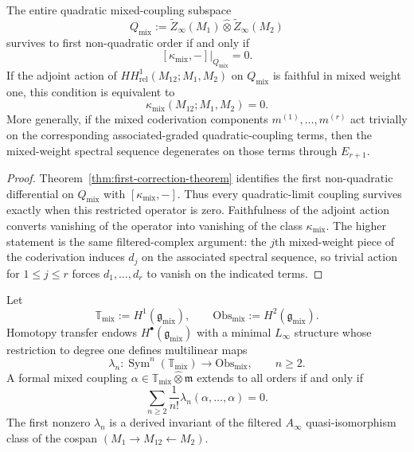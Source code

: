 \begin{corollary}
\label{cor:persistence-criterion-quadratic-law}
The entire quadratic mixed-coupling subspace
\[
Q_{\mathrm{mix}}
:=
\widetilde Z_\infty(M_1)\widehat\otimes \widetilde Z_\infty(M_2)
\]
survives to first non-quadratic order if and only if
\[
[\kappa_{\mathrm{mix}},-]\big|_{Q_{\mathrm{mix}}}=0.
\]
If the adjoint action of
$HH^1_{\mathrm{rel}}(M_{12};M_1,M_2)$ on $Q_{\mathrm{mix}}$ is faithful in mixed weight one, this condition is equivalent to
\[
\kappa_{\mathrm{mix}}(M_{12};M_1,M_2)=0.
\]
More generally, if the mixed coderivation components $m^{(1)},\dots,m^{(r)}$ act trivially on the corresponding associated-graded quadratic-coupling terms, then the mixed-weight spectral sequence degenerates on those terms through $E_{r+1}$.
\end{corollary}

\begin{proof}
Theorem~\ref{thm:first-correction-theorem} identifies the first
non-quadratic differential on $Q_{\mathrm{mix}}$ with
$[\kappa_{\mathrm{mix}},-]$. Thus every quadratic-limit coupling
survives exactly when this restricted operator is zero. Faithfulness
of the adjoint action converts vanishing of the operator into
vanishing of the class $\kappa_{\mathrm{mix}}$. The higher statement
is the same filtered-complex argument: the $j$th mixed-weight piece
of the coderivation induces $d_j$ on the associated spectral sequence,
so trivial action for $1\le j\le r$ forces $d_1,\dots,d_r$ to vanish
on the indicated terms.
\end{proof}

\begin{theorem}
\label{thm:universal-interaction-brackets}
Let
\[
\mathbb T_{\mathrm{mix}}:=H^1(\mathfrak g_{\mathrm{mix}}),
\qquad
\mathrm{Obs}_{\mathrm{mix}}:=H^2(\mathfrak g_{\mathrm{mix}}).
\]
Homotopy transfer endows $H^\bullet(\mathfrak g_{\mathrm{mix}})$ with a minimal $L_\infty$ structure whose restriction to degree one defines multilinear maps
\[
\lambda_n : \operatorname{Sym}^n(\mathbb T_{\mathrm{mix}}) \longrightarrow \mathrm{Obs}_{\mathrm{mix}},
\qquad n\ge 2.
\]
A formal mixed coupling $\alpha\in \mathbb T_{\mathrm{mix}}\widehat\otimes \mathfrak m$ extends to all orders if and only if
\[
\sum_{n\ge 2}\frac{1}{n!}\lambda_n(\alpha,\dots,\alpha)=0.
\]
The first nonzero $\lambda_n$ is a derived invariant of the filtered $A_\infty$ quasi-isomorphism class of the cospan $(M_1\to M_{12}\leftarrow M_2)$.
\end{theorem}

